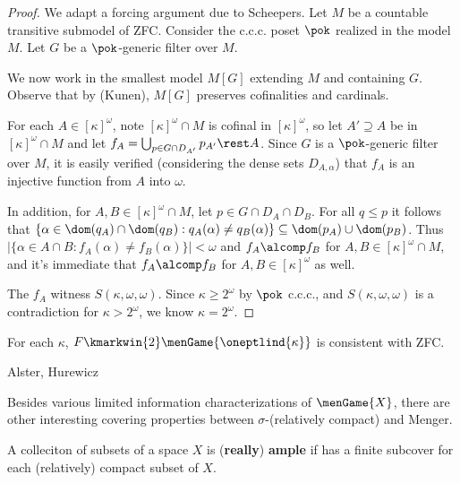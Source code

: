   \begin{proof}
    We adapt a forcing argument due to Scheepers. Let $M$ be a countable transitive submodel of ZFC. Consider the c.c.c. poset $\pok$ realized in the model $M$. Let $G$ be a $\pok$-generic filter over $M$.

    We now work in the smallest model $M[G]$ extending $M$ and containing $G$. Observe that by (Kunen), $M[G]$ preserves cofinalities and cardinals.

    For each $A\in [\kappa]^\omega$, note $[\kappa]^\omega\cap M$ is cofinal in $[\kappa]^\omega$, so let $A'\supseteq A$ be in $[\kappa]^\omega\cap M$ and let $f_A=\bigcup_{p\in G\cap D_{A'}}p_{A'}\rest A$. Since $G$ is a $\pok$-generic filter over $M$, it is easily verified (considering the dense sets $D_{A,\alpha}$) that $f_A$ is an injective function from $A$ into $\omega$.

    In addition, for $A,B\in [\kappa]^\omega\cap M$, let $p\in G\cap D_A\cap D_B$. For all $q\leq p$ it follows that $\{\alpha\in \dom(q_A)\cap \dom(q_B): q_A(\alpha)\not= q_B(\alpha)\} \subseteq \dom(p_A)\cup\dom(p_B)$. Thus $|\{\alpha\in A\cap B: f_A(\alpha)\not= f_B(\alpha)\}|<\omega$ and $f_A\alcomp f_B$ for $A,B\in [\kappa]^\omega\cap M$, and it's immediate that $f_A\alcomp f_B$ for $A,B\in[\kappa]^\omega$ as well.

    The $f_A$ witness $S(\kappa,\omega,\omega)$. Since $\kappa\geq 2^\omega$ by $\pok$ c.c.c., and $S(\kappa,\omega,\omega)$ is a contradiction for $\kappa>2^\omega$, we know $\kappa=2^\omega$.
  \end{proof}

  \begin{cor}
    For each $\kappa$, $F\kmarkwin{2}\menGame{\oneptlind{\kappa}}$ is consistent with ZFC.
  \end{cor}









\newpage

  \centerline{Alster, Hurewicz}

  Besides various limited information characterizations of $\menGame{X}$, there are other interesting covering properties between $\sigma$-(relatively compact) and Menger.

  \begin{defn}
    A colleciton of subsets of a space $X$ is (\textbf{really}) \textbf{ample} if has a finite subcover for each (relatively) compact subset of $X$.
  \end{defn}

